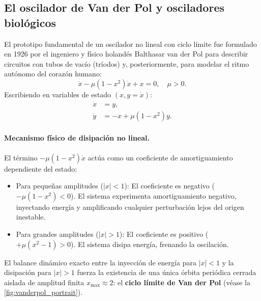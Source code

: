 \subsection{El oscilador de Van der Pol y osciladores biológicos}

El prototipo fundamental de un oscilador no lineal con ciclo límite fue formulado en 1926 por el ingeniero y físico holandés Balthasar van der Pol para describir circuitos con tubos de vacío (tríodos) y, posteriormente, para modelar el ritmo autónomo del corazón humano:
\begin{equation}
    \ddot{x} - \mu (1 - x^2)\dot{x} + x = 0, \quad \mu > 0.
    \label{eq:vanderpol_ode}
\end{equation}
Escribiendo en variables de estado $(x, y = \dot{x})$:
\begin{equation}
\begin{aligned}
    \dot{x} &= y, \\
    \dot{y} &= -x + \mu(1 - x^2)y.
\end{aligned}
\label{eq:vanderpol_sistema}
\end{equation}

\paragraph{Mecanismo físico de disipación no lineal.}
El término $-\mu(1 - x^2)\dot{x}$ actúa como un coeficiente de amortiguamiento dependiente del estado:
\begin{itemize}
    \item Para pequeñas amplitudes ($|x| < 1$): El coeficiente es negativo ($-\mu(1-x^2) < 0$). El sistema experimenta amortiguamiento negativo, inyectando energía y amplificando cualquier perturbación lejos del origen inestable.
    \item Para grandes amplitudes ($|x| > 1$): El coeficiente es positivo ($+\mu(x^2-1) > 0$). El sistema disipa energía, frenando la oscilación.
\end{itemize}
El balance dinámico exacto entre la inyección de energía para $|x| < 1$ y la disipación para $|x| > 1$ fuerza la existencia de una única órbita periódica cerrada aislada de amplitud finita $x_{\max} \approx 2$: el \textbf{ciclo límite de Van der Pol} (véase la \cref{fig:vanderpol_portrait}).

